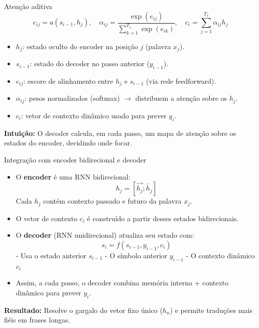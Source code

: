 \documentclass{beamer}
\begin{document}
\begin{frame}{Atenção aditiva \cite{bahdanau2014neural}}
\[
e_{ij} = a(s_{i-1}, h_j), \quad
\alpha_{ij} = \frac{\exp(e_{ij})}{\sum_{k=1}^{T_x} \exp(e_{ik})}, \quad
c_i = \sum_{j=1}^{T_x} \alpha_{ij} h_j
\]

\begin{itemize}
  \item $h_j$: estado oculto do encoder na posição $j$ (palavra $x_j$).
  \item $s_{i-1}$: estado do decoder no passo anterior ($y_{i-1}$).
  \item $e_{ij}$: escore de alinhamento entre $h_j$ e $s_{i-1}$ (via rede feedforward).
  \item $\alpha_{ij}$: pesos normalizados (softmax) $\to$ distribuem a atenção sobre os $h_j$.
  \item $c_i$: vetor de contexto dinâmico usado para prever $y_i$.
\end{itemize}

\textbf{Intuição:} O decoder calcula, em cada passo, um mapa de atenção sobre os estados do encoder, decidindo onde focar.
\end{frame}

\begin{frame}{Integração com encoder bidirecional e decoder}
\begin{itemize}
  \item O \textbf{encoder} é uma RNN bidirecional:
  \[
  h_j = [\overrightarrow{h_j}; \overleftarrow{h_j}]
  \]
  Cada $h_j$ contém contexto passado e futuro da palavra $x_j$.
  
  \item O vetor de contexto $c_i$ é construído a partir desses estados bidirecionais.
  
  \item O \textbf{decoder} (RNN unidirecional) atualiza seu estado com:
  \[
  s_i = f(s_{i-1}, y_{i-1}, c_i)
  \]
  - Usa o estado anterior $s_{i-1}$
  - O símbolo anterior $y_{i-1}$
  - O contexto dinâmico $c_i$
  
  \item Assim, a cada passo, o decoder combina memória interna + contexto dinâmico para prever $y_i$.
\end{itemize}

\textbf{Resultado:} 
Resolve o gargalo do vetor fixo único ($h_n$) e permite traduções mais fiéis em frases longas.
\end{frame}
\end{document}
